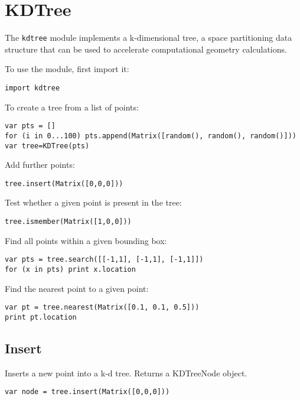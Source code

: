\hypertarget{kdtree}{%
\section{KDTree}\label{kdtree}}

The \texttt{kdtree} module implements a k-dimensional tree, a space
partitioning data structure that can be used to accelerate computational
geometry calculations.

To use the module, first import it:

\begin{lstlisting}
import kdtree
\end{lstlisting}

To create a tree from a list of points:

\begin{lstlisting}
var pts = []
for (i in 0...100) pts.append(Matrix([random(), random(), random()]))
var tree=KDTree(pts)
\end{lstlisting}

Add further points:

\begin{lstlisting}
tree.insert(Matrix([0,0,0]))
\end{lstlisting}

Test whether a given point is present in the tree:

\begin{lstlisting}
tree.ismember(Matrix([1,0,0]))
\end{lstlisting}

Find all points within a given bounding box:

\begin{lstlisting}
var pts = tree.search([[-1,1], [-1,1], [-1,1]])
for (x in pts) print x.location
\end{lstlisting}

Find the nearest point to a given point:

\begin{lstlisting}
var pt = tree.nearest(Matrix([0.1, 0.1, 0.5]))
print pt.location
\end{lstlisting}

\hypertarget{insert}{%
\subsection{Insert}\label{insert}}

Inserts a new point into a k-d tree. Returns a KDTreeNode object.

\begin{lstlisting}
var node = tree.insert(Matrix([0,0,0]))
\end{lstlisting}

